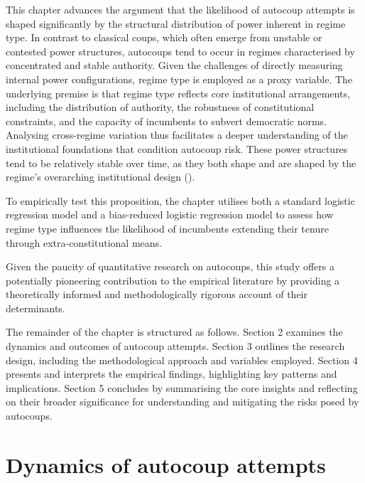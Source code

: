 \documentclass[
  12pt,
]{report}
\begin{document}
This chapter advances the argument that the likelihood of autocoup
attempts is shaped significantly by the structural distribution of power
inherent in regime type. In contrast to classical coups, which often
emerge from unstable or contested power structures, autocoups tend to
occur in regimes characterised by concentrated and stable authority.
Given the challenges of directly measuring internal power
configurations, regime type is employed as a proxy variable. The
underlying premise is that regime type reflects core institutional
arrangements, including the distribution of authority, the robustness of
constitutional constraints, and the capacity of incumbents to subvert
democratic norms. Analysing cross-regime variation thus facilitates a
deeper understanding of the institutional foundations that condition
autocoup risk. These power structures tend to be relatively stable over
time, as they both shape and are shaped by the regime's overarching
institutional design ().

To empirically test this proposition, the chapter utilises both a
standard logistic regression model and a bias-reduced logistic
regression model to assess how regime type influences the likelihood of
incumbents extending their tenure through extra-constitutional means.

Given the paucity of quantitative research on autocoups, this study
offers a potentially pioneering contribution to the empirical literature
by providing a theoretically informed and methodologically rigorous
account of their determinants.

The remainder of the chapter is structured as follows. Section 2
examines the dynamics and outcomes of autocoup attempts. Section 3
outlines the research design, including the methodological approach and
variables employed. Section 4 presents and interprets the empirical
findings, highlighting key patterns and implications. Section 5
concludes by summarising the core insights and reflecting on their
broader significance for understanding and mitigating the risks posed by
autocoups.

\section{Dynamics of autocoup
attempts}\label{dynamics-of-autocoup-attempts}
\end{document}
